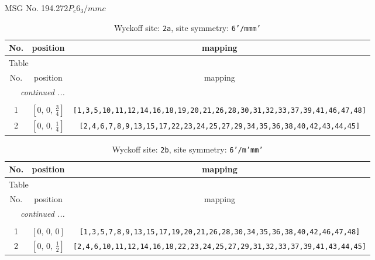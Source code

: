 \documentclass[fleqn,8pt]{jsarticle}
\begin{document}
\setcounter{MaxMatrixCols}{32}

\renewcommand{\tablename}{Table~}
\renewcommand{\figurename}{Figure~}
\begin{center}
\LARGE
MSG No. 194.272\quad$P_{c}6_{3}/mmc$
\end{center}
\renewcommand{\arraystretch}{1.2}
\begin{longtable}{ccc}
\caption{Wyckoff site: {\tt 2a}, site symmetry: {\tt 6'/mmm'}}
 \\
 \hline \hline
No. & position & mapping \\ \hline \endfirsthead

\multicolumn{2}{l}{\tablename\ \thetable{}} \\
 \hline \hline
No. & position & mapping \\ \hline \endhead

 \hline \hline
\multicolumn{2}{r}{\footnotesize\it continued ...} \\ \endfoot

 \hline \hline
\multicolumn{2}{r}{} \\ \endlastfoot

1 & $\left[ 0,\, 0,\, \frac{3}{4} \right]$ & {\tt [1,3,5,10,11,12,14,16,18,19,20,21,26,28,30,31,32,33,37,39,41,46,47,48]} \\ \hline
2 & $\left[ 0,\, 0,\, \frac{1}{4} \right]$ & {\tt [2,4,6,7,8,9,13,15,17,22,23,24,25,27,29,34,35,36,38,40,42,43,44,45]} \\
\end{longtable}
\renewcommand{\arraystretch}{1.2}
\begin{longtable}{ccc}
\caption{Wyckoff site: {\tt 2b}, site symmetry: {\tt 6'/m'mm'}}
 \\
 \hline \hline
No. & position & mapping \\ \hline \endfirsthead

\multicolumn{2}{l}{\tablename\ \thetable{}} \\
 \hline \hline
No. & position & mapping \\ \hline \endhead

 \hline \hline
\multicolumn{2}{r}{\footnotesize\it continued ...} \\ \endfoot

 \hline \hline
\multicolumn{2}{r}{} \\ \endlastfoot

1 & $\left[ 0,\, 0,\, 0 \right]$ & {\tt [1,3,5,7,8,9,13,15,17,19,20,21,26,28,30,34,35,36,38,40,42,46,47,48]} \\ \hline
2 & $\left[ 0,\, 0,\, \frac{1}{2} \right]$ & {\tt [2,4,6,10,11,12,14,16,18,22,23,24,25,27,29,31,32,33,37,39,41,43,44,45]} \\
\end{longtable}
\end{document}
